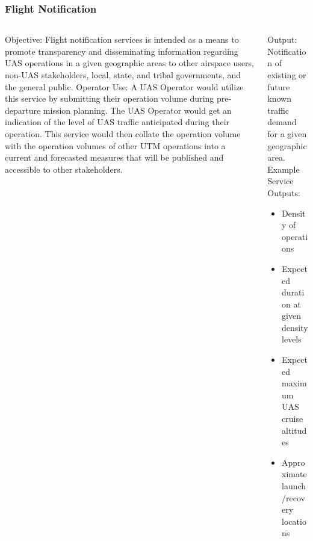 \documentclass[usenames,dvipsnames,aspectratio=169,serif]{beamer}
\begin{document}
%
\begin{frame}
   \frametitle{Flight Notification}
   \begin{columns}[t]
      \begin{column}{0.5\textwidth}
         Objective: Flight notification services is intended as a means to promote transparency and disseminating information regarding UAS operations in a given geographic areas to other airspace users, non-UAS stakeholders, local, state, and tribal governments, and the general public.
         Operator Use: A UAS Operator would utilize this service by submitting their operation volume during pre-departure mission planning. The UAS Operator would get an indication of the level of UAS traffic anticipated during their operation. This service would then collate the operation volume with the operation volumes of other UTM operations into a current and forecasted measures that will be published and accessible to other stakeholders.
      \end{column}
      \begin{column}{0.5\textwidth}
         Output: Notification of existing or future known traffic demand for a given geographic area.
         Example Service Outputs:
         \begin{itemize}
         \item  Density of operations
         \item  Expected duration at given density levels
         \item  Expected maximum UAS cruise altitudes
         \item  Approximate launch/recovery locations
         \end{itemize}
      \end{column}
   \end{columns}
\end{frame}
\end{document}
